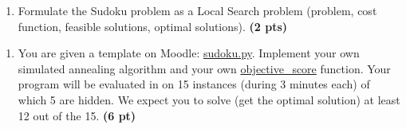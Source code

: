 \documentclass[11pt,a4paper]{report}
\begin{document}
\begin{enumerate}
    \item Formulate the Sudoku problem as a Local Search problem (problem, cost function, feasible solutions, optimal solutions). \textbf{(2 pts)}
\end{enumerate}

\begin{answer}

\end{answer}

\begin{enumerate}
    \item You are given a template on Moodle: \url{sudoku.py}. Implement your own simulated annealing algorithm and your own \url{objective\_score} function. Your program will be evaluated in on 15 instances (during 3 minutes each) of which 5 are hidden. We expect you to solve (get the optimal solution) at least 12 out of the 15. \textbf{(6 pt)}
\end{enumerate}

\begin{answer}
\end{answer}
\end{document}
